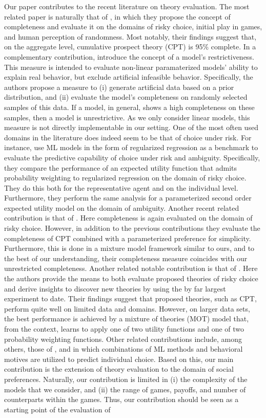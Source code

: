 \documentclass[11pt,a4paper]{article}
\theoremstyle{definition}
\begin{document}
Our paper contributes to the recent literature on theory evaluation. The most related paper is naturally that of \cite{Fudenberg2021b}, in which they propose the concept of completeness and evaluate it on the domains of risky choice,  initial play in games, and human perception of randomness. Most notably, their findings suggest that, on the aggregate level, cumulative prospect theory (CPT) is 95\% complete. In a complementary contribution, \cite{Fudenberg2021a} introduce the concept of a model's restrictiveness. This measure is intended to evaluate non-linear paramaterized models' ability to explain real behavior, but exclude artificial infeasible behavior. Specifically, the authors propose a measure to (i) generate artificial data based on a prior distribution, and (ii) evaluate the model's completeness on randomly selected samples of this data. If a model, in general, shows a high completeness on these samples, then a model is unrestrictive. As we only consider linear models, this measure is not directly implementable in our setting. One of the most often used domains in the literature does indeed seem to be that of choice under risk. For instance, \cite{Peysakhovich2017} use ML models in the form of regularized regression as a benchmark to evaluate the predictive capability of choice under risk and ambiguity. Specifically, they compare the performance of an expected utility function that admits probability weighting to regularized regression on the domain of risky choice. They do this both for the representative agent and on the individual level. Furthermore, they perform the same analysis for a parameterized second order expected utility model on the domain of ambiguity. Another recent related contribution is that of \cite{Fudenberg2021c}. Here completeness is again evaluated on the domain of risky choice. However, in addition to the previous contributions they evaluate the completeness of CPT combined with a parameterized preference for simplicity. Furthermore, this is done in a mixture model framework similar to ours, and to the best of our understanding, their completeness measure coincides with our unrestricted completeness. Another related notable contribution is that of \cite{Peterson2021}. Here the authors provide the means to both evaluate proposed theories of risky choice and derive insights to discover new theories by using the by far largest experiment to date. Their findings suggest that proposed theories, such as CPT, perform quite well on limited data and domains. However, on larger data sets, the best performance is achieved by a mixture of theories (MOT) model that, from the context, learns to apply one of two utility functions and one of two probability weighting functions. Other related contributions include, among others, those of \cite{Noti2016}, \cite{Plonsky2017} and \cite{Plonsky2019} in which combinations of ML methods and behavioral motives are utilized to predict individual choice. Based on this, our main contribution is the extension of theory evaluation to the domain of social preferences. Naturally, our contribution is limited in (i) the complexity of the models that we consider, and (ii) the range of games, payoffs, and number of counterparts within the games. Thus, our contribution should be seen as a starting point of the evaluation of 
\end{document}
